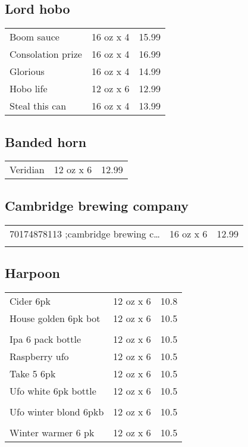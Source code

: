 \documentclass{article}%
\begin{document}
\begin{multicols}{3}
%
\subsection*{Lord hobo}%
\begin{tabular}{l c r}%
Boom sauce&16 oz x 4&15.99\\%
Consolation prize&16 oz x 4&16.99\\%
Glorious&16 oz x 4&14.99\\%
Hobo life&12 oz x 6&12.99\\%
Steal this can&16 oz x 4&13.99\\%
\end{tabular}

%
\subsection*{Banded horn}%
\begin{tabular}{l c r}%
Veridian&12 oz x 6&12.99\\%
\end{tabular}

%
\subsection*{Cambridge brewing company}%
\begin{tabular}{l c r}%
\multirow{1}{15ex}{70174878113 ;cambridge brewing c…}&16 oz x 6&12.99\\%
&&\\%
\end{tabular}

%
\subsection*{Harpoon}%
\begin{tabular}{l c r}%
Cider 6pk&12 oz x 6&10.8\\%
\multirow{1}{15ex}{House golden 6pk bot}&12 oz x 6&10.5\\%
&&\\%
Ipa 6 pack bottle&12 oz x 6&10.5\\%
Raspberry ufo&12 oz x 6&10.5\\%
Take 5 6pk&12 oz x 6&10.5\\%
\multirow{1}{15ex}{Ufo white 6pk bottle}&12 oz x 6&10.5\\%
&&\\%
\multirow{1}{15ex}{Ufo winter blond 6pkb}&12 oz x 6&10.5\\%
&&\\%
Winter warmer 6 pk&12 oz x 6&10.5\\%
\end{tabular}


\end{multicols}
\end{document}
